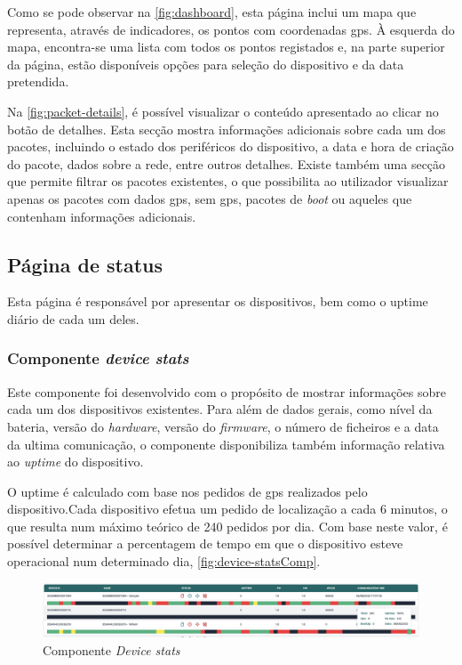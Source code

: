 Como se pode observar na \autoref{fig:dashboard}, esta página inclui um mapa que representa, através de indicadores, os pontos com coordenadas \acs{gps}. À esquerda do mapa, encontra-se uma lista com todos os pontos registados e, na parte superior da página, estão disponíveis opções para seleção do dispositivo e da data pretendida.

Na \autoref{fig:packet-details}, é possível visualizar o conteúdo apresentado ao clicar no botão de detalhes. Esta secção mostra informações adicionais sobre cada um dos pacotes, incluindo o estado dos periféricos do dispositivo, a data e hora de criação do pacote, dados sobre a rede, entre outros detalhes. Existe também uma secção que permite filtrar os pacotes existentes, o que possibilita ao utilizador visualizar apenas os pacotes com dados \acs{gps}, sem \acs{gps}, pacotes de \textit{boot} ou aqueles que contenham informações adicionais.

\subsection{Página de status}\label{sec:interfaceStatus} %
Esta página é responsável por apresentar os dispositivos, bem como o uptime diário de cada um deles.

\subsubsection{\textbf{Componente \textit{device stats}}}
Este componente foi desenvolvido com o propósito de mostrar informações sobre cada um dos dispositivos existentes. Para além de dados gerais, como nível da bateria, versão do \textit{hardware}, versão do \textit{firmware}, o número de ficheiros e a data da ultima comunicação, o componente disponibiliza também informação relativa ao \textit{uptime} do dispositivo.

O uptime é calculado com base nos pedidos de \acs{gps} realizados pelo dispositivo.Cada dispositivo efetua um pedido de localização a cada 6 minutos, o que resulta num máximo teórico de 240 pedidos por dia. Com base neste valor, é possível determinar a percentagem de tempo em que o dispositivo esteve operacional num determinado dia, \autoref{fig:device-statsComp}.

\begin{figure}[h!]
    \centering
    \includegraphics[width=\textwidth]{figs/device-stats.png}
    \caption{Componente \textit{Device stats}}
    \label{fig:device-statsComp}
\end{figure}

